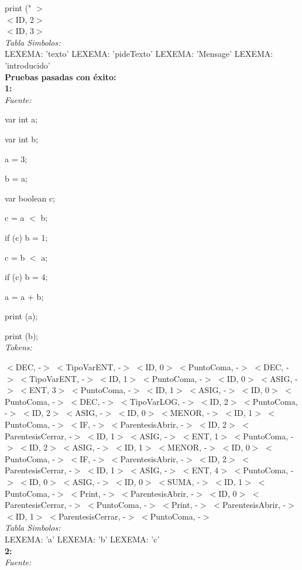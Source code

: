 \documentclass[a4paper, 12pt]{article}
\begin{document}
	print (" $>$
 \\$<$ID, 2$>$ 
 \\$<$ID, 3$>$\medskip\\
\emph{Tabla Simbolos:}\\
  LEXEMA: 'texto'
  LEXEMA: 'pideTexto'
  LEXEMA: 'Mensage'
  LEXEMA: 'introducido'\bigskip \\
\textbf{Pruebas pasadas con éxito:}\medskip\\
\textbf{1:}\smallskip\\
\emph{Fuente:} \smallskip


var int a;
 
var int b;

a = 3;

b = a;

 var boolean c;
 
c = a  $<$  b;

if (c) b  =  1;

c = b  $<$  a;

if (c) b  =  4;

 a = a  +  b;
 
print (a);

print (b);\medskip \\
\emph{Tokens:}

\smallskip 
 $<$DEC, -$>$ 
 $<$TipoVarENT, -$>$ 
 $<$ID, 0$>$ 
 $<$PuntoComa, -$>$ 
 $<$DEC, -$>$
 $<$TipoVarENT, -$>$ 
 $<$ID, 1$>$ 
 $<$PuntoComa, -$>$ 
 $<$ID, 0$>$ 
 $<$ASIG, -$>$ 
 $<$ENT, 3$>$ 
 $<$PuntoComa, -$>$ 
 $<$ID, 1$>$ 
 $<$ASIG, -$>$ 
 $<$ID, 0$>$ 
 $<$PuntoComa, -$>$ 
 $<$DEC, -$>$ 
 $<$TipoVarLOG, -$>$ 
 $<$ID, 2$>$ 
 $<$PuntoComa, -$>$ 
 $<$ID, 2$>$ 
 $<$ASIG, -$>$ 
 $<$ID, 0$>$ 
 $<$MENOR, -$>$ 
 $<$ID, 1$>$ 
 $<$PuntoComa, -$>$ 
 $<$IF, -$>$ 
 $<$ParentesisAbrir, -$>$ 
 $<$ID, 2$>$ 
 $<$ParentesisCerrar, -$>$ 
 $<$ID, 1$>$ 
 $<$ASIG, -$>$ 
 $<$ENT, 1$>$ 
 $<$PuntoComa, -$>$ 
 $<$ID, 2$>$ 
 $<$ASIG, -$>$ 
 $<$ID, 1$>$ 
 $<$MENOR, -$>$ 
 $<$ID, 0$>$ 
 $<$PuntoComa, -$>$ 
 $<$IF, -$>$ 
 $<$ParentesisAbrir, -$>$ 
 $<$ID, 2$>$ 
 $<$ParentesisCerrar, -$>$ 
 $<$ID, 1$>$ 
 $<$ASIG, -$>$ 
 $<$ENT, 4$>$ 
 $<$PuntoComa, -$>$ 
 $<$ID, 0$>$ 
 $<$ASIG, -$>$ 
 $<$ID, 0$>$ 
 $<$SUMA, -$>$ 
 $<$ID, 1$>$ 
 $<$PuntoComa, -$>$ 
 $<$Print, -$>$ 
 $<$ParentesisAbrir, -$>$ 
 $<$ID, 0$>$ 
 $<$ParentesisCerrar, -$>$ 
 $<$PuntoComa, -$>$ 
 $<$Print, -$>$ 
 $<$ParentesisAbrir, -$>$ 
 $<$ID, 1$>$ 
 $<$ParentesisCerrar, -$>$ 
 $<$PuntoComa, -$>$\medskip\\
\emph{Tabla Simbolos:}\\ 
  LEXEMA: 'a'
  LEXEMA: 'b'
  LEXEMA: 'c'\bigskip \\
\textbf{2:}\medskip\\
\emph{Fuente:}
\end{document}
